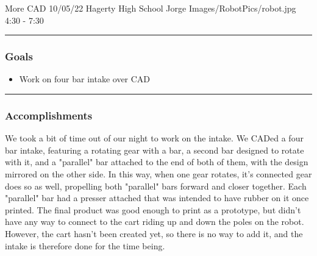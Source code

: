 \insertmeeting 
	{More CAD} 
	{10/05/22}
	{Hagerty High School}
	{Jorge}
	{Images/RobotPics/robot.jpg}
	{4:30 - 7:30}
	
\noindent\hfil\rule{\textwidth}{.4pt}\hfil
\subsubsection*{Goals}
\begin{itemize}
    \item Work on four bar intake over CAD

\end{itemize} 

\noindent\hfil\rule{\textwidth}{.4pt}\hfil

\subsubsection*{Accomplishments}
We took a bit of time out of our night to work on the intake. We CADed a four bar intake, featuring a rotating gear with a bar, a second bar designed to rotate with it, and a "parallel" bar attached to the end of both of them, with the design mirrored on the other side. In this way, when one gear rotates, it's connected gear does so as well, propelling both "parallel" bars forward and closer together. Each "parallel" bar had a presser attached that was intended to have rubber on it once printed. The final product was good enough to print as a prototype, but didn't have any way to connect to the cart riding up and down the poles on the robot. However, the cart hasn't been created yet, so there is no way to add it, and the intake is therefore done for the time being.




